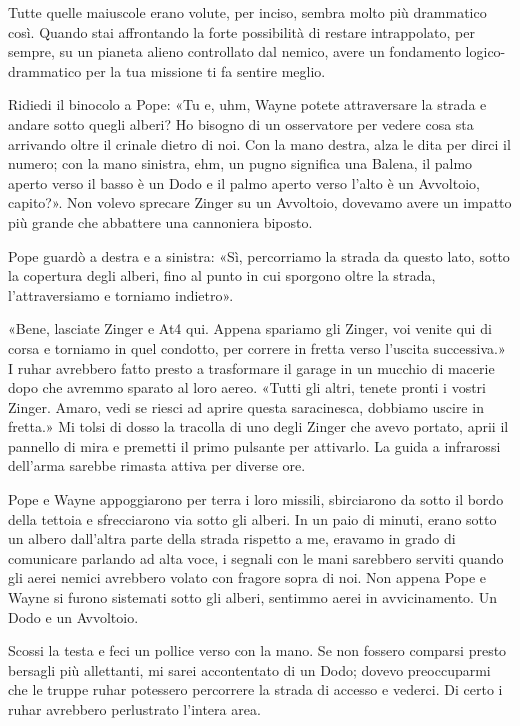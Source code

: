 Tutte quelle maiuscole erano volute, per inciso, sembra molto più
drammatico così. Quando stai affrontando la forte possibilità di restare
intrappolato, per sempre, su un pianeta alieno controllato dal nemico,
avere un fondamento logico-drammatico per la tua missione ti fa sentire
meglio.

Ridiedi il binocolo a Pope: «Tu e, uhm, Wayne potete attraversare la
strada e andare sotto quegli alberi? Ho bisogno di un osservatore per
vedere cosa sta arrivando oltre il crinale dietro di noi. Con la mano
destra, alza le dita per dirci il numero; con la mano sinistra, ehm, un
pugno significa una Balena, il palmo aperto verso il basso è un Dodo e
il palmo aperto verso l'alto è un Avvoltoio, capito?». Non volevo
sprecare Zinger su un Avvoltoio, dovevamo avere un impatto più grande
che abbattere una cannoniera biposto.

Pope guardò a destra e a sinistra: «Sì, percorriamo la strada da questo
lato, sotto la copertura degli alberi, fino al punto in cui sporgono
oltre la strada, l'attraversiamo e torniamo indietro».

«Bene, lasciate Zinger e At4 qui. Appena spariamo gli Zinger, voi venite
qui di corsa e torniamo in quel condotto, per correre in fretta verso
l'uscita successiva.» I ruhar avrebbero fatto presto a trasformare il
garage in un mucchio di macerie dopo che avremmo sparato al loro aereo.
«Tutti gli altri, tenete pronti i vostri Zinger. Amaro, vedi se riesci
ad aprire questa saracinesca, dobbiamo uscire in fretta.» Mi tolsi di
dosso la tracolla di uno degli Zinger che avevo portato, aprii il
pannello di mira e premetti il primo pulsante per attivarlo. La guida a
infrarossi dell'arma sarebbe rimasta attiva per diverse ore.

Pope e Wayne appoggiarono per terra i loro missili, sbirciarono da sotto
il bordo della tettoia e sfrecciarono via sotto gli alberi. In un paio
di minuti, erano sotto un albero dall'altra parte della strada rispetto
a me, eravamo in grado di comunicare parlando ad alta voce, i segnali
con le mani sarebbero serviti quando gli aerei nemici avrebbero volato
con fragore sopra di noi. Non appena Pope e Wayne si furono sistemati
sotto gli alberi, sentimmo aerei in avvicinamento. Un Dodo e un
Avvoltoio.

Scossi la testa e feci un pollice verso con la mano. Se non fossero
comparsi presto bersagli più allettanti, mi sarei accontentato di un
Dodo; dovevo preoccuparmi che le truppe ruhar potessero percorrere la
strada di accesso e vederci. Di certo i ruhar avrebbero perlustrato
l'intera area.

